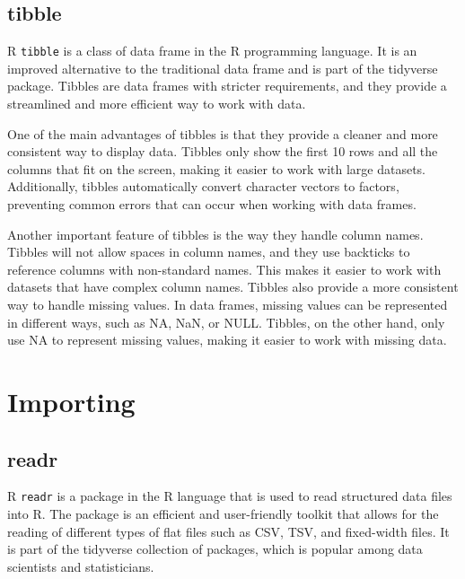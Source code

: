 \documentclass[
]{book}
\begin{document}
\hypertarget{tibble}{%
\subsection*{tibble}\label{tibble}}

R \texttt{tibble} is a class of data frame in the R programming language. It is an improved alternative to the traditional data frame and is part of the tidyverse package. Tibbles are data frames with stricter requirements, and they provide a streamlined and more efficient way to work with data.

One of the main advantages of tibbles is that they provide a cleaner and more consistent way to display data. Tibbles only show the first 10 rows and all the columns that fit on the screen, making it easier to work with large datasets. Additionally, tibbles automatically convert character vectors to factors, preventing common errors that can occur when working with data frames.

Another important feature of tibbles is the way they handle column names. Tibbles will not allow spaces in column names, and they use backticks to reference columns with non-standard names. This makes it easier to work with datasets that have complex column names. Tibbles also provide a more consistent way to handle missing values. In data frames, missing values can be represented in different ways, such as NA, NaN, or NULL. Tibbles, on the other hand, only use NA to represent missing values, making it easier to work with missing data.

\hypertarget{importing}{%
\section{Importing}\label{importing}}

\hypertarget{readr}{%
\subsection*{readr}\label{readr}}

R \texttt{readr} is a package in the R language that is used to read structured data files into R. The package is an efficient and user-friendly toolkit that allows for the reading of different types of flat files such as CSV, TSV, and fixed-width files. It is part of the tidyverse collection of packages, which is popular among data scientists and statisticians.
\end{document}
